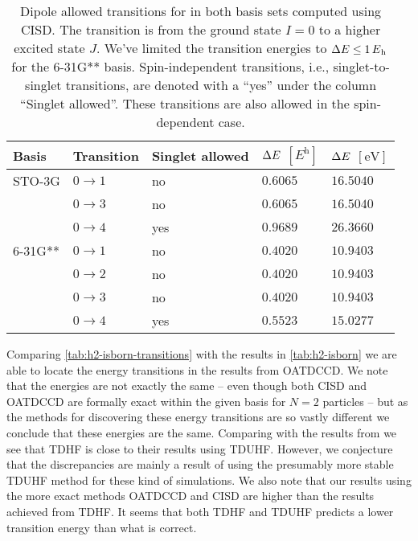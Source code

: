         \begin{table}
            \centering
            \caption{Dipole allowed transitions for  in both basis sets
            computed using CISD.
            The transition is from the ground state $I = 0$ to a higher excited
            state $J$.
            We've limited the transition energies to $\Delta \energy \leq
            \SI{1}{\hartree}$ for the 6-31G** basis.
            Spin-independent transitions, i.e., singlet-to-singlet transitions,
            are denoted with a ``yes'' under the column ``Singlet allowed''.
            These transitions are also allowed in the spin-dependent case.}
            \begin{tabular}{@{}lllll@{}}
                \toprule
                Basis & Transition & Singlet allowed
                & $\Delta E$ $[\si{\hartree}]$
                & $\Delta E$ $[\si{\electronvolt}]$ \\
                \midrule
                STO-3G & $0 \to 1$ & no & $0.6065$ & $16.5040$ \\
                & $0 \to 3$ & no & $0.6065$ & $16.5040$ \\
                & $0 \to 4$ & yes & $0.9689$ & $26.3660$ \\
                6-31G** & $0 \to 1$ & no & $0.4020$ & $10.9403$ \\
                & $0 \to 2$ & no & $0.4020$ & $10.9403$ \\
                & $0 \to 3$ & no & $0.4020$ & $10.9403$ \\
                & $0 \to 4$ & yes & $0.5523$ & $15.0277$ \\
                \bottomrule
            \end{tabular}
            \label{tab:h2-isborn-transitions}
        \end{table}
        Comparing \autoref{tab:h2-isborn-transitions} with the results in
        \autoref{tab:h2-isborn} we are able to locate the energy transitions in the
        results from OATDCCD.
        We note that the energies are not exactly the same -- even though both
        CISD and OATDCCD are formally exact within the given basis for $N = 2$
        particles -- but as the methods for discovering these energy transitions
        are so vastly different we conclude that these energies are the same.
        Comparing with the results from \citeauthor{isborn} we see that TDHF is
        close to their results using TDUHF.
        However, we conjecture that the discrepancies are mainly a result of
        \citeauthor{isborn} using the presumably more stable TDUHF method for
        these kind of simulations.
        We also note that our results using the more exact methods OATDCCD and
        CISD are higher than the results achieved from TDHF.
        It seems that both TDHF and TDUHF predicts a lower transition energy
        than what is correct.

